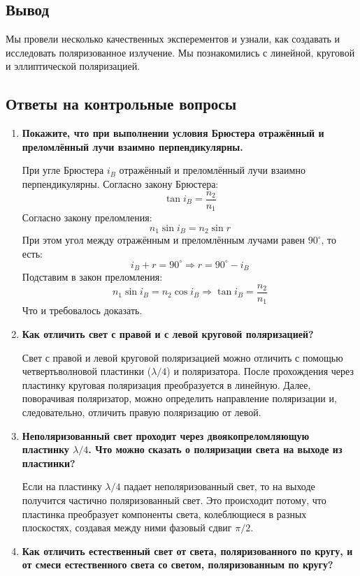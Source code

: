 \subsection*{Вывод}
Мы провели несколько качественных эксперементов и узнали, как создавать и исследовать поляризованное излучение. Мы познакомились с линейной, круговой и эллиптической поляризацией.

\newpage

\subsection*{Ответы на контрольные вопросы}
\begin{enumerate}
    \item \textbf{Покажите, что при выполнении условия Брюстера отражённый и преломлённый лучи взаимно перпендикулярны.}

    При угле Брюстера $i_B$ отражённый и преломлённый лучи взаимно перпендикулярны. Согласно закону Брюстера:
    \[
    \tan i_B = \frac{n_2}{n_1}
    \]
    Согласно закону преломления:
    \[
    n_1 \sin i_B = n_2 \sin r
    \]
    При этом угол между отражённым и преломлённым лучами равен $90^\circ$, то есть:
    \[
    i_B + r = 90^\circ \Rightarrow r = 90^\circ - i_B
    \]
    Подставим в закон преломления:
    \[
    n_1 \sin i_B = n_2 \cos i_B \Rightarrow \tan i_B = \frac{n_2}{n_1}
    \]
    Что и требовалось доказать.

    \item \textbf{Как отличить свет с правой и с левой круговой поляризацией?}

    Свет с правой и левой круговой поляризацией можно отличить с помощью четвертьволновой пластинки ($\lambda/4$) и поляризатора. После прохождения через пластинку круговая поляризация преобразуется в линейную. Далее, поворачивая поляризатор, можно определить направление поляризации и, следовательно, отличить правую поляризацию от левой.

    \item \textbf{Неполяризованный свет проходит через двоякопреломляющую пластинку $\lambda/4$. Что можно сказать о поляризации света на выходе из пластинки?}

    Если на пластинку $\lambda/4$ падает неполяризованный свет, то на выходе получится частично поляризованный свет. Это происходит потому, что пластинка преобразует компоненты света, колеблющиеся в разных плоскостях, создавая между ними фазовый сдвиг $\pi/2$.

    \item \textbf{Как отличить естественный свет от света, поляризованного по кругу, и от смеси естественного света со светом, поляризованным по кругу?}


\end{enumerate}
